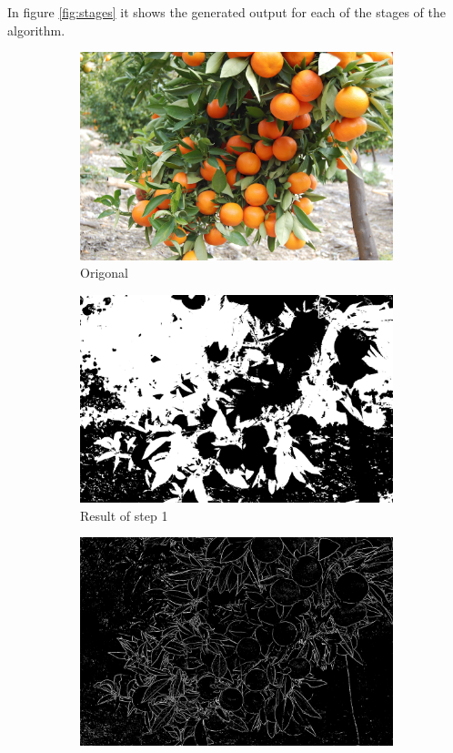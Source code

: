 \documentclass[conference]{IEEEtran}
\begin{document}
In figure \ref{fig:stages} it shows the generated output for each of the stages of the algorithm. 


\begin{figure}[H]
  \begin{subfigure}{.3\linewidth}
   \includegraphics[width=\linewidth]{citrus1/citrus1_orig.jpg}\hfill
   \caption{Origonal}
  \end{subfigure}
  \begin{subfigure}{.3\linewidth}
    \includegraphics[width=\linewidth]{citrus1/citrus1_NDI.jpg}\hfill
    \caption{Result of step 1}
  \end{subfigure}
  \begin{subfigure}{.3\linewidth}
    \includegraphics[width=\linewidth]{citrus1/citrus1_mean.jpg}

\end{subfigure}
\end{figure}
\end{document}
